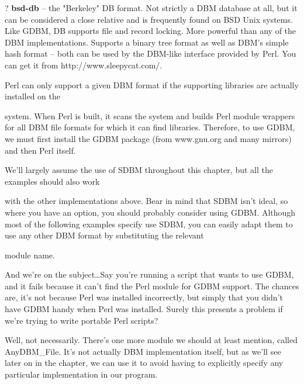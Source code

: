 \documentclass[a4paper,11pt]{book}
\begin{document}
\noindent 

\noindent ? \textbf{bsd-db   }-- the "Berkeley" DB format. Not strictly a DBM database at all, but it can be considered a close relative and is frequently found on BSD Unix systems. Like GDBM, DB supports file and record locking. More powerful than any of the DBM implementations. Supports a binary tree format as well as DBM's simple hash format -- both can be used by the DBM-like interface provided by Perl. You can get it from http://www.sleepycat.com/.

\noindent 

\noindent Perl can only support a given DBM format if the supporting libraries are actually installed on the

\noindent system. When Perl is built, it scans the system and builds Perl module wrappers for all DBM file formats for which it can find libraries. Therefore, to use GDBM, we must first install the GDBM package (from www.gnu.org and many mirrors) and then Perl itself.

\noindent 

\noindent 

\noindent We'll largely assume the use of SDBM throughout this chapter, but all the examples should also work

\noindent with the other implementations above. Bear in mind that SDBM isn't ideal, so where you have an option, you should probably consider using GDBM. Although most of the following examples specify use SDBM, you can easily adapt them to use any other DBM format by substituting the relevant

\noindent module name.

\noindent 

\noindent And we're on the subject\dots  Say you're running a script that wants to use GDBM, and it   fails because it can't find the Perl module for GDBM support. The chances are, it's not because Perl was installed incorrectly, but simply that you didn't have GDBM handy when Perl was installed. Surely this presents a problem if we're trying to write portable Perl scripts?

\noindent 

\noindent Well, not necessarily. There's one more module we should at least mention, called AnyDBM\_File. It's not actually DBM implementation itself, but as we'll see later on in the chapter, we can use it to avoid having to explicitly specify any particular implementation in our program.

\noindent 
\end{document}
